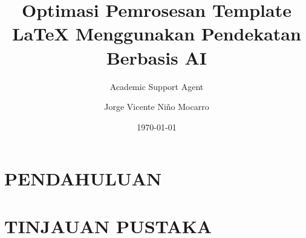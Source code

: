 \documentclass{article}
\title{Optimasi Pemrosesan Template LaTeX Menggunakan Pendekatan Berbasis AI}
\author{Academic Support Agent}
\date{\today}
\begin{document}
\maketitle

\begin{abstract}

\end{abstract}

\chapter{PENDAHULUAN}


\chapter{TINJAUAN PUSTAKA}


\usepackage[utf8]{inputenc}
\usepackage[T1]{fontenc}
\usepackage[spanish]{babel}
\usepackage{amsmath}
\usepackage{amsfonts}
\usepackage{amssymb}
\usepackage{graphicx}
\usepackage{float}
\usepackage{lipsum}
\usepackage{multicol}
\usepackage{xcolor}
\newcommand{\celda}[1]{
	\begin{minipage}{2cm}
		\vspace{2mm}
		#1
		\vspace{2mm}
	\end{minipage}
}
\usepackage[left=2.00cm, right=2.00cm, top=2.00cm, bottom=2.00cm]{geometry}
\author{Jorge Vicente Niño Mocarro}
\end{document}
